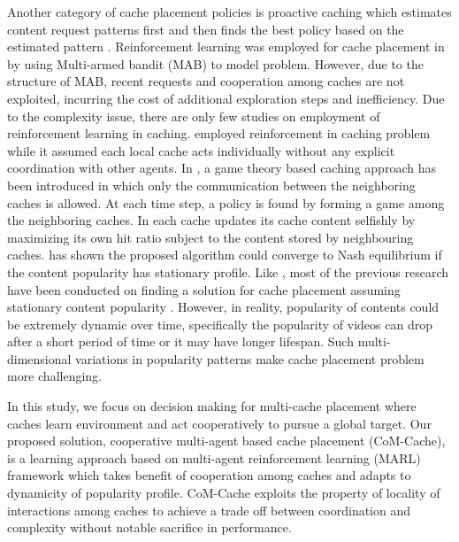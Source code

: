 \documentclass[journal,onecolumn]{IEEEtran}
\begin{document}
Another category of  cache placement policies is proactive caching which estimates content request patterns first and then finds the best policy based on the estimated pattern \cite{laoutaris2005optimization}\cite{poularakis2016complexity}. Reinforcement learning was employed for cache placement in \cite{blasco2014learning} by using Multi-armed bandit (MAB) to model problem. However, due to the structure of MAB, recent requests and cooperation among caches are not exploited, incurring the cost of additional exploration steps and inefficiency.
Due to the complexity issue, there are only few studies on employment of reinforcement learning in caching. \cite{sung2016efficient} employed reinforcement in caching problem while it assumed each local cache acts individually without any explicit coordination with other agents.
In \cite{avrachenkov2017low}, a game theory based caching approach has been introduced in which only the communication between the neighboring caches is allowed. At each time step, a policy is found by forming a game among the neighboring caches. In \cite{avrachenkov2017low} each cache updates its cache content selfishly by maximizing its own hit ratio subject to the content stored by neighbouring caches. \cite{avrachenkov2017low} has shown the proposed algorithm could converge to Nash equilibrium if the content popularity has stationary profile. 
Like \cite{avrachenkov2017low}, most of the previous research have been conducted on finding a solution for cache placement assuming stationary content popularity \cite{poularakis2016caching}. However, in reality, popularity of contents could be extremely dynamic over time, specifically the popularity of videos can drop after a short period of time or it may have longer lifespan. 
Such multi-dimensional variations in popularity patterns make cache placement problem more challenging.





In this study, we focus on decision making for multi-cache placement where caches learn environment and act cooperatively to pursue a global target. Our proposed solution, cooperative multi-agent based cache placement (CoM-Cache), is a learning approach based on multi-agent reinforcement learning (MARL) framework which takes benefit of cooperation among caches and adapts to dynamicity of popularity profile. CoM-Cache exploits the property of locality of interactions among caches \cite {oliehoek2008exploiting} to achieve a trade off between coordination and complexity without notable sacrifice in performance.
\end{document}
